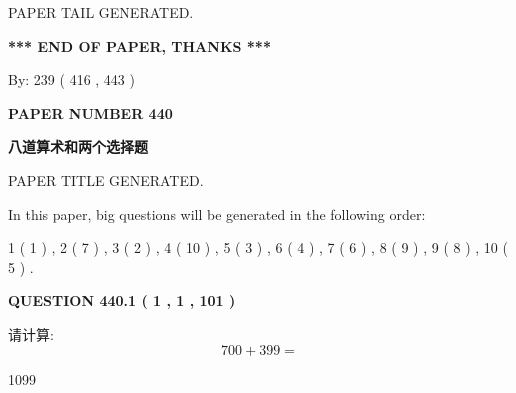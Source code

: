 \documentclass{ctexart}
\begin{document}
   
   
\vspace{2.0in} PAPER TAIL GENERATED.
   
   
   
   
\vspace{1.0in} 
{\textbf{\large{ *** END OF PAPER, THANKS *** }}} 
   
   
\hspace{1.0in} By: 
 239 ( 416 ,  443 )
   
   
   
   
\newpage 
\setcounter{page}{ 
   440001 } 
   
   
   
   
 {\textbf{ \Large{ PAPER NUMBER  440  }}}
   
   
\vspace{0.2in}
   
   
   
   
   
   
   
   
 \vspace{0.2in}
{\LARGE {\textbf{ 八道算术和两个选择题}}}
   
   
 PAPER TITLE GENERATED.
   
   
   
\vspace{0.2in}
   
In this paper, big questions will be generated in the following order: 
   
   
   1 ( 1 )
 ,
   2 ( 7 )
 ,
   3 ( 2 )
 ,
   4 ( 10 )
 ,
   5 ( 3 )
 ,
   6 ( 4 )
 ,
   7 ( 6 )
 ,
   8 ( 9 )
 ,
   9 ( 8 )
 ,
   10 ( 5 )
 .
  
\vspace{0.2in}
  
{\textbf{\Large{QUESTION
440.1 
 ( 1 , 1 , 101 )
}}}
  
  
 
请计算:
\begin{equation}
700 +  %
399 = \nonumber
\end{equation}
 
 
 
\noindent{}
 
 

1099
 
 
\noindent{}
 
\end{document}
